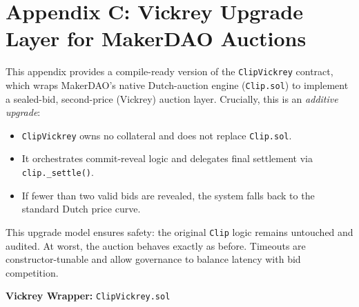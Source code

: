 \documentclass[11pt]{article}
\begin{document}
\section*{Appendix C: Vickrey Upgrade Layer for MakerDAO Auctions}

This appendix provides a compile-ready version of the \texttt{ClipVickrey} contract, which wraps MakerDAO's native Dutch-auction engine (\texttt{Clip.sol}) \parencite{makerdao-clip-docs} to implement a sealed-bid, second-price (Vickrey) auction layer. Crucially, this is an \emph{additive upgrade}:
\begin{itemize}
  \item \texttt{ClipVickrey} owns no collateral and does not replace \texttt{Clip.sol}.
  \item It orchestrates commit-reveal logic and delegates final settlement via \texttt{clip.\_settle()}.
  \item If fewer than two valid bids are revealed, the system falls back to the standard Dutch price curve.
\end{itemize}
This upgrade model ensures safety: the original \texttt{Clip} logic remains untouched and audited. At worst, the auction behaves exactly as before. Timeouts are constructor-tunable and allow governance to balance latency with bid competition.

\bigskip

\noindent\textbf{Vickrey Wrapper:} \texttt{ClipVickrey.sol}
\end{document}
